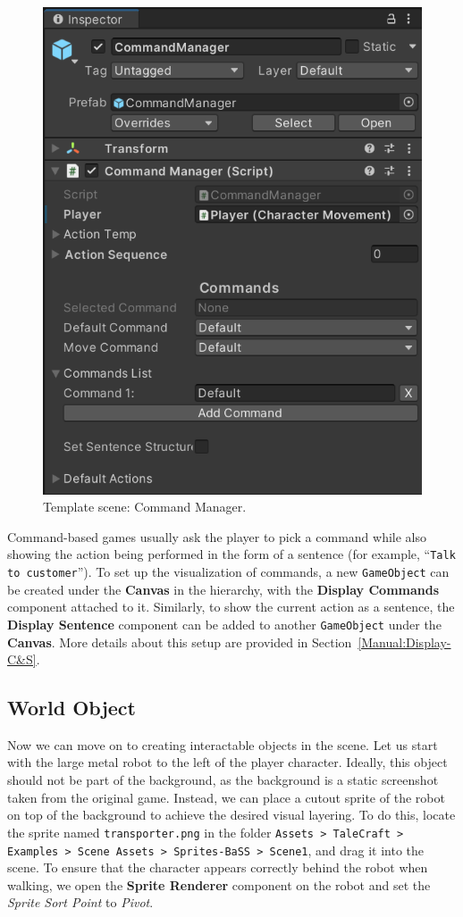 \begin{figure}[H]
\centering
\includegraphics[width=0.6\linewidth]{img/User doc/image_2025-07-08_214350710.png}
\caption{Template scene: Command Manager.}
\label{fig:Tutorial-template:CM}
\end{figure}

Command-based games usually ask the player to pick a command while also showing the action being performed in the form of a sentence (for example, “\verb|Talk to customer|”). To set up the visualization of commands, a new \verb|GameObject| can be created under the \textbf{Canvas} in the hierarchy, with the \textbf{Display Commands} component attached to it. Similarly, to show the current action as a sentence, the \textbf{Display Sentence} component can be added to another \verb|GameObject| under the \textbf{Canvas}. More details about this setup are provided in Section~\ref{Manual:Display-C&S}.

\subsection{World Object}
Now we can move on to creating interactable objects in the scene. Let us start with the large metal robot to the left of the player character. Ideally, this object should not be part of the background, as the background is a static screenshot taken from the original game. Instead, we can place a cutout sprite of the robot on top of the background to achieve the desired visual layering. To do this, locate the sprite named \verb|transporter.png| in the folder \texttt{Assets > TaleCraft > Examples > Scene Assets > Sprites-BaSS > Scene1}, and drag it into the scene. To ensure that the character appears correctly behind the robot when walking, we open the \textbf{Sprite Renderer} component on the robot and set the \textit{Sprite Sort Point} to \textit{Pivot}.

